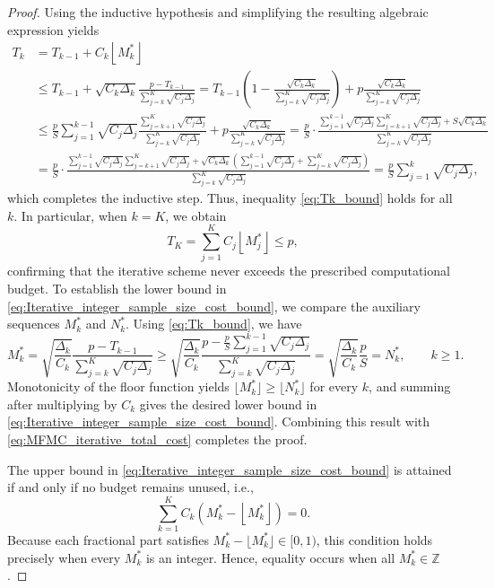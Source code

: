 \begin{proof}
Using the inductive hypothesis and simplifying the resulting algebraic expression yields
\begin{align*}
    T_k &= T_{k-1}+C_k\left\lfloor M_k^* \right\rfloor \\
    &\le T_{k-1} + \sqrt{C_k\Delta_k}\frac{p-T_{k-1}}{\sum_{j=k}^K\sqrt{C_j\Delta_j}}
    =T_{k-1}\left(1-\frac{\sqrt{C_k\Delta_k}}{\sum_{j=k}^K\sqrt{C_j\Delta_j}}\right) + p\frac{\sqrt{C_k\Delta_k}}{\sum_{j=k}^K\sqrt{C_j\Delta_j}}\\
    &\le \frac{p}{S}\sum_{j=1}^{k-1} \sqrt{C_j\Delta_j}\frac{\sum_{j=k+1}^K\sqrt{C_j\Delta_j}}{\sum_{j=k}^K\sqrt{C_j\Delta_j}}+p\frac{\sqrt{C_k\Delta_k}}{\sum_{j=k}^K\sqrt{C_j\Delta_j}}=\frac{p}{S}\cdot \frac{\sum_{j=1}^{k-1} \sqrt{C_j\Delta_j}\sum_{j=k+1}^K\sqrt{C_j\Delta_j}+S\sqrt{C_k\Delta_k}}{\sum_{j=k}^K\sqrt{C_j\Delta_j}}\\
    &=\frac{p}{S}\cdot \frac{\sum_{j=1}^{k-1} \sqrt{C_j\Delta_j}\sum_{j=k+1}^K\sqrt{C_j\Delta_j}+\sqrt{C_k\Delta_k}\left(\sum_{j=1}^{k-1}\sqrt{C_j\Delta_j}+\sum_{j=k}^K\sqrt{C_j\Delta_j}\right)}{\sum_{j=k}^K\sqrt{C_j\Delta_j}}
    =\frac{p}{S}\sum_{j=1}^k\sqrt{C_j\Delta_j},
\end{align*}
%
which completes the inductive step. Thus, inequality \eqref{eq:Tk_bound} holds for all $k$. 
In particular, when $k=K$, we obtain
\begin{equation}\label{eq:MFMC_iterative_total_cost}
T_K = \sum_{j=1}^K C_j\left\lfloor M_j^*\right\rfloor \le p,
\end{equation}
confirming that the iterative scheme never exceeds the prescribed computational budget. To establish the lower bound in \eqref{eq:Iterative_integer_sample_size_cost_bound}, we compare the auxiliary sequences $M_k^*$ and $N_k^*$. Using \eqref{eq:Tk_bound}, we have
%
\[
M_k^* = \sqrt{\frac{\Delta_k}{C_k}}\frac{p - T_{k-1}}{\sum_{j=k}^K\sqrt{C_j\Delta_j}} \ge \sqrt{\frac{\Delta_k}{C_k}}\frac{p-\frac{p}{S}\sum_{j=1}^{k-1}\sqrt{C_j\Delta_j}}{\sum_{j=k}^K\sqrt{C_j\Delta_j}} = \sqrt{\frac{\Delta_k}{C_k}}\frac{p}{S}=N_k^*, \qquad k \ge 1.
\]
% 
Monotonicity of the floor function yields \(\lfloor M_k^*\rfloor\ge\lfloor N_k^*\rfloor\) for every \(k\), and summing after multiplying by \(C_k\) gives the desired lower bound in \eqref{eq:Iterative_integer_sample_size_cost_bound}.  Combining this result with \eqref{eq:MFMC_iterative_total_cost} completes the proof.

\vspace{4mm}
The upper bound in \eqref{eq:Iterative_integer_sample_size_cost_bound} is attained if and only if no budget remains unused, i.e.,
\[
\sum_{k=1}^K C_k \left(M_k^* - \left\lfloor M_k^*\right\rfloor\right) = 0.
\]
Because each fractional part satisfies $M_k^* - \lfloor M_k^* \rfloor \in [0,1)$, this condition holds precisely when every $M_k^*$ is an integer. Hence, equality occurs when all $M_k^* \in \mathbb{Z}$.


\end{proof}
